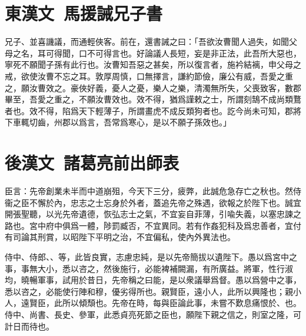 \theendnotes

\section[馬援誡兄子嚴敦書\quad{\small 東漢文}]{{\normalsize 東漢文\ 馬援}\quad 誡兄子書}
兄子、並喜譏議，而通輕俠客。前在，還書誡之曰：「吾欲汝曹聞人過失，如聞父母之名，耳可得聞，口不可得言也。好論議人長短，妄是非正法，此吾所大惡也，寧死不願聞子孫有此行也。汝曹知吾惡之甚矣，所以復言者，施衿結褵，申父母之戒，欲使汝曹不忘之耳。敦厚周慎，口無擇言，謙約節儉，廉公有威，吾愛之重之，願汝曹效之。豪俠好義，憂人之憂，樂人之樂，清濁無所失，父喪致客，數郡畢至，吾愛之重之，不願汝曹效也。效不得，猶爲謹敕之士，所謂刻鵠不成尚類鶩者也。效不得，陷爲天下輕薄子，所謂畫虎不成反類狗者也。訖今尚未可知，郡將下車輒切齒，州郡以爲言，吾常爲寒心，是以不願子孫效也。」

\section[諸葛亮前出師表\quad{\small 後漢文}]{{\normalsize 後漢文\ 諸葛亮}\quad 前出師表}
臣言：先帝創業未半而中道崩殂，今天下三分，疲弊，此誠危急存亡之秋也。然侍衞之臣不懈於內，忠志之士忘身於外者，蓋追先帝之殊遇，欲報之於陛下也。誠宜開張聖聽，以光先帝遺德，恢弘志士之氣，不宜妄自菲薄，引喩失義，以塞忠諫之路也。宮中府中俱爲一體，陟罰臧否，不宜異同。若有作姦犯科及爲忠善者，宜付有司論其刑賞，以昭陛下平明之治，不宜偏私，使內外異法也。

侍中、侍郎、、等，此皆良實，志慮忠純，是以先帝簡拔以遺陛下。愚以爲宮中之事，事無大小，悉以咨之，然後施行，必能裨補闕漏，有所廣益。將軍，性行淑均，曉暢軍事，試用於昔日，先帝稱之曰能，是以衆議舉爲督。愚以爲營中之事，悉以咨之，必能使行陣和穆，優劣得所也。親賢臣，遠小人，此所以興隆也；親小人，遠賢臣，此所以傾頹也。先帝在時，每與臣論此事，未嘗不歎息痛恨於、也。侍中、尚書、長史、參軍，此悉貞亮死節之臣也，願陛下親之信之，則室之隆，可計日而待也。

